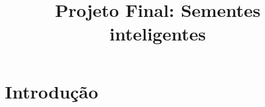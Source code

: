\documentclass[code,math,diagrams]{relatorio-deti}
\title{Projeto Final: Sementes inteligentes}
\begin{document}
\maketitle

\chapter{Introdução}

\lipsum[1-4]
\end{document}
